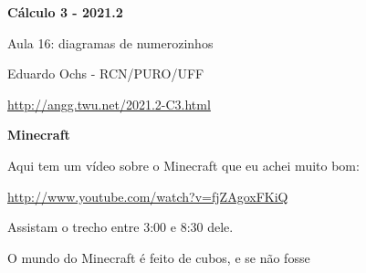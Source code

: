 \documentclass[oneside,12pt]{article}
\begin{document}



\def\u#1{\par{\footnotesize \url{#1}}}

\def\drafturl{http://angg.twu.net/LATEX/2021-2-C3.pdf}
\def\drafturl{http://angg.twu.net/2021.2-C3.html}
\def\draftfooter{\tiny \href{\drafturl}{\jobname{}} \ColorBrown{\shorttoday{} \hours}}



%

\thispagestyle{empty}

\begin{center}

\vspace*{1.2cm}

{\bf \Large Cálculo 3 - 2021.2}

\bsk

Aula 16: diagramas de numerozinhos

\bsk

Eduardo Ochs - RCN/PURO/UFF

\url{http://angg.twu.net/2021.2-C3.html}

\end{center}

\newpage


{\bf Minecraft}

Aqui tem um vídeo sobre o Minecraft que eu achei muito bom:

\ssk

{\footnotesize

\url{http://www.youtube.com/watch?v=fjZAgoxFKiQ}

}

\ssk

Assistam o trecho entre 3:00 e 8:30 dele.

\bsk

O mundo do Minecraft é feito de cubos, e se não fosse
\end{document}
